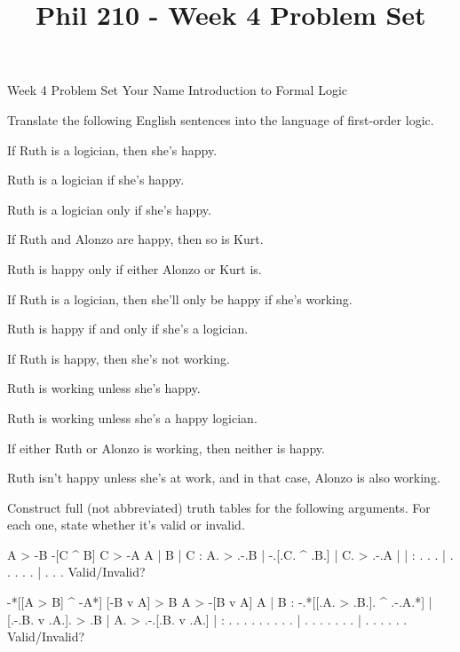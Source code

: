 
\title{Phil 210 - Week 4 Problem Set}

\heading
Week 4 Problem Set
Your Name
Introduction to Formal Logic
\endheading

Translate the following English sentences into the language of first-order logic.

\problems
{}
If Ruth is a logician, then she's happy.
	\answer
	$ $
	\endanswer

Ruth is a logician if she's happy.
	\answer
	$ $
	\endanswer

Ruth is a logician only if she's happy.
	\answer
	$ $
	\endanswer

If Ruth and Alonzo are happy, then so is Kurt.
	\answer
	$ $
	\endanswer

Ruth is happy only if either Alonzo or Kurt is.
	\answer
	$ $
	\endanswer

If Ruth is a logician, then she'll only be happy if she's working.
	\answer
	$ $
	\endanswer

Ruth is happy if and only if she's a logician.
	\answer
	$ $
	\endanswer

If Ruth is happy, then she's not working.
	\answer
	$ $
	\endanswer

Ruth is working unless she's happy.
	\answer
	$ $
	\endanswer

Ruth is working unless she's a happy logician.
	\answer
	$ $
	\endanswer

If either Ruth or Alonzo is working, then neither is happy.
	\answer
	$ $
	\endanswer

Ruth isn't happy unless she's at work, and in that case, Alonzo is also working.
	\answer
	$ $
	\endanswer

\endproblems

Construct full (not abbreviated) truth tables for the following arguments. For each one, state whether it's valid or invalid.

\problems
{}
\argument
 A > -B
 -[C ^ B]
\argumentline
 C > -A
\endargument
	\answer
	\truthtable
	 A | B | C : A. > .-.B | -.[.C. ^ .B.] | C. > .-.A
	\truthtableline
	   |   |   :  .   . .  |  . . .   . .  |  .   . . 
	\endtruthtable
	Valid/Invalid?
	\endanswer

\argument
 -*[[A > B] ^ -A*]
 [-B v A] > B
\argumentline
 A > -[B v A]
\endargument
	\answer
	\truthtable
	 A | B : -.*[[.A. > .B.]. ^ .-.A.*] | [.-.B. v .A.]. > .B | A. > .-.[.B. v .A.]
	\truthtableline
	   |   :  .   . .   . . .   . . .   |  . . .   . . .   .  |  .   . . . .   . 
	\endtruthtable
	Valid/Invalid?
	\endanswer


